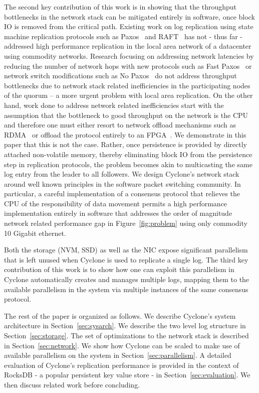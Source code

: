 \documentclass[twocolumn]{article}
\begin{document}
The second key contribution of this work is in showing that the throughput
bottlenecks in the network stack can be mitigated entirely in software, once
block IO is removed from the critical path. Existing work on log replication
using state machine replication protocols such as Paxos~\cite{paxos} and
RAFT~\cite{raft} has not - thus far - addressed high performance replication in
the local area network of a datacenter using commodity networks.  Research
focusing on addressing network latencies by reducing the number of
network hops with new protocols such as Fast Paxos~\cite{fast-paxos} or network
switch modifications such as No Paxos~\cite{nopaxos} do not address throughput
bottlenecks due to network stack related inefficiencies in the participating
nodes of the quorum -- a more urgent problem with local area replication. On the
other hand, work done to address network related inefficiencies start with the
assumption that the bottleneck to good throughput on the network is the CPU and
therefore one must either resort to network offload mechanisms such as RDMA~\cite{dare,
  farm, faast} or offload the protocol entirely to an
FPGA~\cite{consensus_box}. We demonstrate in this paper that this is not the
case. Rather, once persistence is provided by directly attached non-volatile
memory, thereby eliminating block IO from the persistence step in replication
protocols, the problem becomes akin to multicasting the same log entry
from the leader to all followers. We design Cyclone's network stack around well
known principles in the software packet switching community. In particular, a
careful implementation of a consensus protocol that relieves the CPU of the
responsibility of data movement permits a high performance implementation
entirely in software that addresses the order of magnitude network related
performance gap in Figure~\ref{fig:problem} using only commodity 10 Gigabit
ethernet.

Both the storage (NVM, SSD) as well as the NIC expose significant parallelism
that is left unused when Cyclone is used to replicate a single log. The third
key contribution of this work is to show how one can exploit this parallelism in
Cyclone automatically creates and manages multiple logs, mapping them to the 
available parallelism in the system via multiple instances of the same consensus 
protocol.

The rest of the paper is organized as follows. We describe Cyclone's system
architecture in Section~\ref{sec:sysarch}. We describe the two level log
structure in Section~\ref{sec:storage}. The set of optimizations to the network
stack is described in Section~\ref{sec:network}. We show how Cyclone can be
scaled to make use of available parallelism on the system in
Section~\ref{sec:parallelism}. A detailed evaluation of Cyclone's replication
performance is provided in the context of RocksDB - a popular persistent key
value store - in Section~\ref{sec:evaluation}. We then discuss related work
before concluding.
\end{document}
